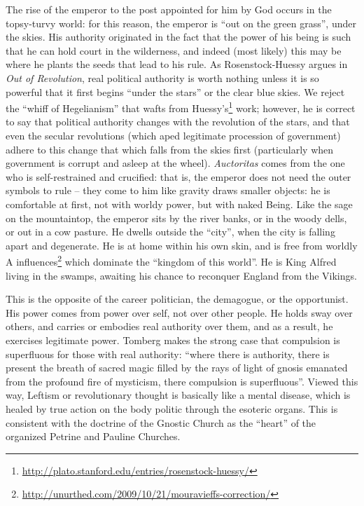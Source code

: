 The rise of the emperor to the post appointed for him by God occurs in the topsy-turvy world: for this reason, the emperor is ``out on the green grass'', under the skies. His authority originated in the fact that the power of his being is such that he can hold court in the wilderness, and indeed (most likely) this may be where he plants the seeds that lead to his rule. As Rosenstock-Huessy argues in \emph{Out of Revolution}, real political authority is worth nothing unless it is so powerful that it first begins ``under the stars'' or the clear blue skies. We reject the ``whiff of Hegelianism'' that wafts from Huessy's\footnote{\url{http://plato.stanford.edu/entries/rosenstock-huessy/}} work; however, he is correct to say that political authority changes with the revolution of the stars, and that even the secular revolutions (which aped legitimate procession of government) adhere to this change that which falls from the skies first (particularly when government is corrupt and asleep at the wheel). \emph{Auctoritas} comes from the one who is self-restrained and crucified: that is, the emperor does not need the outer symbols to rule -- they come to him like gravity draws smaller objects: he is comfortable at first, not with worldy power, but with naked Being. Like the sage on the mountaintop, the emperor sits by the river banks, or in the woody dells, or out in a cow pasture. He dwells outside the ``city'', when the city is falling apart and degenerate. He is at home within his own skin, and is free from worldly A influences\footnote{\url{http://unurthed.com/2009/10/21/mouravieffs-correction/}} which dominate the ``kingdom of this world''. He is King Alfred living in the swamps, awaiting his chance to reconquer England from the Vikings.

This is the opposite of the career politician, the demagogue, or the opportunist. His power comes from power over self, not over other people. He holds sway over others, and carries or embodies real authority over them, and as a result, he exercises legitimate power. Tomberg makes the strong case that compulsion is superfluous for those with real authority: ``where there is authority, there is present the breath of sacred magic filled by the rays of light of gnosis emanated from the profound fire of mysticism, there compulsion is superfluous''. Viewed this way, Leftism or revolutionary thought is basically like a mental disease, which is healed by true action on the body politic through the esoteric organs. This is consistent with the doctrine of the Gnostic Church as the ``heart'' of the organized Petrine and Pauline Churches.

